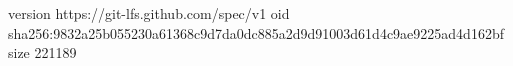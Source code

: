 version https://git-lfs.github.com/spec/v1
oid sha256:9832a25b055230a61368c9d7da0dc885a2d9d91003d61d4c9ae9225ad4d162bf
size 221189
